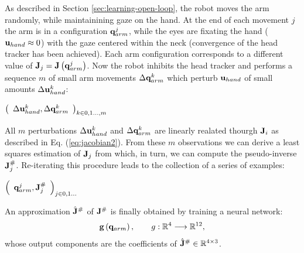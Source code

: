 As described in Section \ref{sec:learning-open-loop}, the robot 
moves the arm randomly, while maintainining gaze on the hand. At 
the end of each movement $j$ the arm is in a configuration 
$\mathbf q_{arm}^j$,  while the eyes are fixating the hand 
($\mathbf{u}_{hand} \approx 0$) with the gaze centered within the neck 
(convergence of the head tracker has been achieved). Each 
arm configuration corresponds to a different value of 
$\mathbf J_j=\mathbf J\left(\mathbf q_{arm}^j\right)$. 
Now the robot inhibits the head tracker and performs a sequence $m$
of small arm movements $\Delta \mathbf {q}_{arm}^k$ which perturb 
$\mathbf{u}_{hand}$ of small amounts $\Delta \mathbf {u}_{hand}^k$:
%
\begin{center}
\begin{math}
  \left(\begin{array}{cc}
    \Delta \mathbf {u}_{hand}^k , 
	\Delta \mathbf {q}_{arm}^k \end{array}
  \right)_{k \in 0,1\dots,m}
\end{math}
\end{center}
%
All $m$ perturbations $\Delta \mathbf {u}_{hand}^k$ and 
$\Delta \mathbf {q}_{arm}^k$ are linearly realated thourgh $\mathbf J_i$ 
as described in Eq. (\ref{eq:jacobian2}). From these $m$ 
observations we can derive a least squares estimation of $\mathbf J_j$ from 
which, in turn, we can compute the pseudo-inverse $\mathbf J_j^\#$. 
Re-iterating this procedure leads to the collection of a series of examples:
%
\begin{center}
\begin{math}
  \left(\begin{array}{cc}
    \mathbf q_{arm}^j , \mathbf J_j^\# \end{array}\right)_{j \in 0,1\dots}
\end{math}
\end{center}
%
An approximation $\hat{\mathbf J}^\#$ of $\mathbf J^\#$ is finally
obtained by training a neural network:
%
\begin{equation}
\mathbf{g}\left(\mathbf q_{arm}\right), \qquad g : \mathbb R^4 \longrightarrow \mathbb R^{12},
\end{equation}
%
whose output components are the coefficients of 
$\hat{\mathbf J}^\# \in \mathbb R^{4 \times 3}$.

